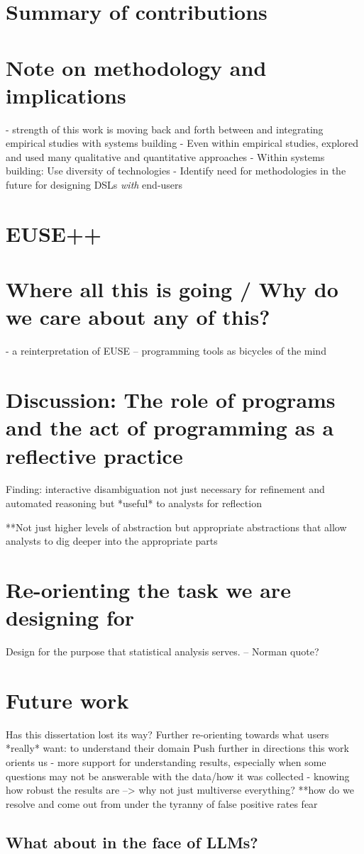 \section{Summary of contributions}
\section{Note on methodology and implications}
- strength of this work is moving back and forth between and integrating empirical studies with systems building
- Even within empirical studies, explored and used many qualitative and quantitative approaches
- Within systems building: Use diversity of technologies
- Identify need for methodologies in the future for designing DSLs \textit{with} end-users

\section{EUSE++}
\section{Where all this is going / Why do we care about any of this?}
- a reinterpretation of EUSE -- programming tools as bicycles of the mind

\section{Discussion: The role of programs and the act of programming as a reflective practice}
Finding: interactive disambiguation not just necessary for refinement and automated reasoning but *useful* to analysts for reflection

**Not just higher levels of abstraction but appropriate abstractions that allow analysts to dig deeper into the appropriate parts


\section{Re-orienting the task we are designing for}
Design for the purpose that statistical analysis serves. -- Norman quote?

\section{Future work}
Has this dissertation lost its way? Further re-orienting towards what users *really* want: to understand their domain
Push further in directions this work orients us 
- more support for understanding results, especially when some questions may not be answerable with the data/how it was collected
- knowing how robust the results are --> why not just multiverse everything?
**how do we resolve and come out from under the tyranny of false positive rates fear

\subsection{}
\subsection{What about in the face of LLMs?}
